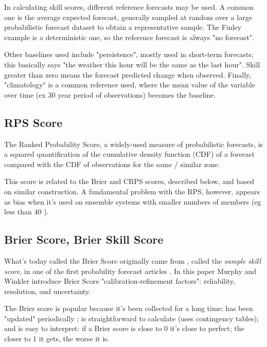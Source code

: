 \documentclass[logos,parttoc,morelanguage=french,morelanguage=german]{orsay-memoire}
\begin{document}
In calculating skill scores, different reference forecasts may be used. A common one is the average expected forecast, generally sampled at random over a large probabilistic forecast dataset to obtain a representative sample. The Finley example is a deterministic one, so the reference forecast is always "no forecast".

Other baselines used include "persistence", mostly used in short-term forecasts; this basically says "the weather this hour will be the same as the last hour". Skill greater than zero means the forecast predicted change when observed. Finally, "climatology" is a common reference used, where the mean value of the variable over time (ex 30 year period of observations) becomes the baseline. \autocite{JolliffeIanT.andStephenson2012ForecastVerification}

\subsection{RPS Score}

The Ranked Probability Score, a widely-used measure of probabilistic forecasts, is a squared quantification of the cumulative density function (CDF) of a forecast compared with the CDF of observations for the same / similar zone. 

This score is related to the Brier and CRPS scores, described below, and based on similar construction. A fundamental problem with the RPS, however, appears as bias when it's used on ensemble systems with smaller numbers of members (eg less than 40 \autocite{weigel2007discrete}).

\subsection{Brier Score, Brier Skill Score}

What's today called the Brier Score originally came from \autocite{brier1950verification}, called the \textit{sample skill score}, in one of the first probability forecast articles \autocite{Murphy1974ProbabilityForecasters}. In this paper Murphy and Winkler introduce Brier Score "calibration-refinement factors": reliability, resolution, and uncertainty.

The Brier score is popular because it's been collected for a long time; has been "updated" periodically \autocite{Murphy1974ProbabilityForecasters}; is straightforward to calculate (uses contingency tables); and is easy to interpret: if a Brier score is close to 0 it's close to perfect; the closer to 1 it gets, the worse it is.
\end{document}
